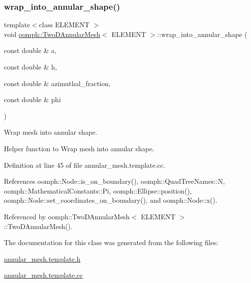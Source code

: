 \subsubsection{\texorpdfstring{wrap\+\_\+into\+\_\+annular\+\_\+shape()}{wrap\_into\_annular\_shape()}}
{\footnotesize\ttfamily template$<$class E\+L\+E\+M\+E\+NT $>$ \\
void \hyperlink{classoomph_1_1TwoDAnnularMesh}{oomph\+::\+Two\+D\+Annular\+Mesh}$<$ E\+L\+E\+M\+E\+NT $>$\+::wrap\+\_\+into\+\_\+annular\+\_\+shape (\begin{DoxyParamCaption}\item[{const double \&}]{a,  }\item[{const double \&}]{h,  }\item[{const double \&}]{azimuthal\+\_\+fraction,  }\item[{const double \&}]{phi }\end{DoxyParamCaption})\hspace{0.3cm}{\ttfamily [private]}}



Wrap mesh into annular shape. 

Helper function to Wrap mesh into annular shape. 

Definition at line 45 of file annular\+\_\+mesh.\+template.\+cc.



References oomph\+::\+Node\+::is\+\_\+on\+\_\+boundary(), oomph\+::\+Quad\+Tree\+Names\+::N, oomph\+::\+Mathematical\+Constants\+::\+Pi, oomph\+::\+Ellipse\+::position(), oomph\+::\+Node\+::set\+\_\+coordinates\+\_\+on\+\_\+boundary(), and oomph\+::\+Node\+::x().



Referenced by oomph\+::\+Two\+D\+Annular\+Mesh$<$ E\+L\+E\+M\+E\+N\+T $>$\+::\+Two\+D\+Annular\+Mesh().



The documentation for this class was generated from the following files\+:\begin{DoxyCompactItemize}
\item 
\hyperlink{annular__mesh_8template_8h}{annular\+\_\+mesh.\+template.\+h}\item 
\hyperlink{annular__mesh_8template_8cc}{annular\+\_\+mesh.\+template.\+cc}\end{DoxyCompactItemize}
